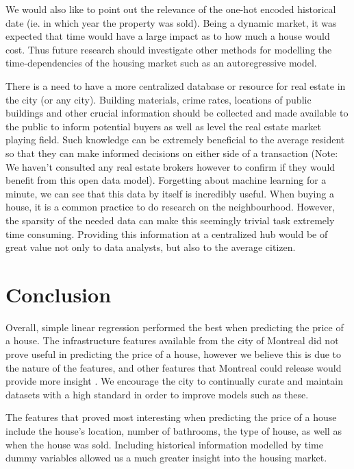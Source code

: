 \documentclass{acm_proc_article-sp}
\begin{document}
	We would also like to point out the relevance of the one-hot encoded historical date (ie. in which year the property was sold). Being a dynamic market, it was expected that time would have a large impact as to how much a house would cost. Thus future research should investigate other methods for modelling the time-dependencies of the housing market such as an autoregressive model.
	
	There is a need to have a more centralized database or resource for real estate in the city (or any city). Building materials, crime rates, locations of public buildings and other crucial information should be collected and made available to the public to inform potential buyers as well as level the real estate market playing field. Such knowledge can be extremely beneficial to the average resident so that they can make informed decisions on either side of a transaction (Note: We haven't consulted any real estate brokers however to confirm if they would benefit from this open data model). Forgetting about machine learning for a minute, we can see that this data by itself is incredibly useful. When buying a house, it is a common practice to do research on the neighbourhood. However, the sparsity of the needed data can make this seemingly trivial task extremely time consuming. Providing this information at a centralized hub would be of great value not only to data analysts, but also to the average citizen.

\section{Conclusion}

	Overall, simple linear regression performed the best when predicting the price of a house. The infrastructure features available from the city of Montreal did not prove useful in predicting the price of a house, however we believe this is due to the nature of the features, and other features that Montreal could release would provide more insight \cite{bostonres}. We encourage the city to continually curate and maintain datasets with a high standard in order to improve models such as these. 
	
	The features that proved most interesting when predicting the price of a house include the house's location, number of bathrooms, the type of house, as well as when the house was sold. Including historical information modelled by time dummy variables allowed us a much greater insight into the housing market.
	
\end{document}
